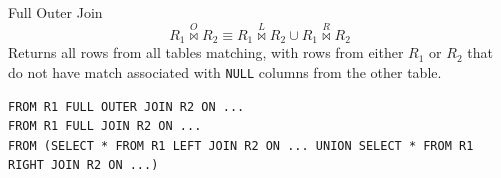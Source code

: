 \begin{definitionbox}{Full Outer Join}
    \[R_1 \overset{O}{\bowtie} R_2 \equiv R_1 \overset{L}{\bowtie} R_2 \cup R_1 \overset{R}{\bowtie} R_2\]
    Returns all rows from all tables matching, with rows from either $R_1$ or $R_2$ that do not have match associated with \texttt{NULL} columns from the other table.
    \begin{center}
    \end{center}
    \begin{verbatim}
FROM R1 FULL OUTER JOIN R2 ON ... 
FROM R1 FULL JOIN R2 ON ... 
FROM (SELECT * FROM R1 LEFT JOIN R2 ON ... UNION SELECT * FROM R1 RIGHT JOIN R2 ON ...)
    \end{verbatim}
\end{definitionbox}


